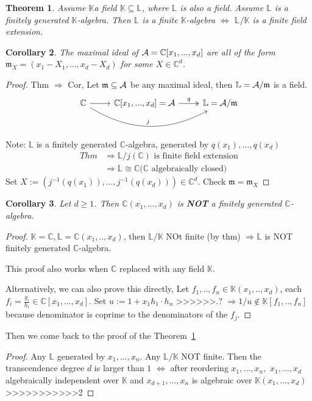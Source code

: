 \documentclass[11pt]{article}
\newtheorem{thm}{Theorem}[section]
\newtheorem{cor}[thm]{Corollary}
\newcommand{\cplx}{\mathbb C}
\newcommand{\bbk}{\mathbb K}
\newcommand{\scm}{{\mathfrak m}}
\newcommand{\cala}{{\cal A}}
\newcommand{\Lrta}{\Longrightarrow}
\newcommand{\Llrta}{\Longleftrightarrow}
\begin{document}
\begin{thm}\label{thm:finite_field_extension}
Assume $\bbk$a field $\bbk\subseteq \mathbb{L}$, where $\mathbb{L}$ is also a field. Assume $\mathbb{L}$ is a finitely generated $\bbk$-algebra. Then $\mathbb{L}$ is a finite $\bbk$-algebra $\Llrta$ $\mathbb{L}/\bbk$ is a finite field extension.
\end{thm}

\begin{cor}
The maximal ideal of $\cala=\cplx[x_1,...,x_d]$ are all of the form $\scm_X=(x_1-X_1,...,x_d-X_d)$ for some $X\in\cplx^d$.
\end{cor}
\begin{proof}
Thm $\Lrta$ Cor, Let $\scm\subseteq \cala$ be any maximal ideal, then $\mathbb{L}=\cala/\scm$ is a field.
 \[
\begin{tikzcd}
\cplx\ar[r]\ar[rr,bend right,"j"]&\cplx[x_1,...,x_d]=\cala\ar[r,two heads,"q"]&\mathbb{L}=\cala/\scm  
\end{tikzcd}
\] 
Note: $\mathbb{L}$ is a finitely generated $\cplx$-algebra, generated by $q(x_1),...,q(x_d)$
$$
\begin{aligned}
Thm&\Lrta \mathbb{L}/j(\cplx)\text{ is finite field extension}\\
 & \Lrta
\mathbb{L}\cong \cplx \text{($\cplx$ algebraically closed)}
\end{aligned}
$$
Set $X:=(j^{-1}(q(x_1)),...,j^{-1}(q(x_d)))\in \cplx^d$. Check $\scm=\scm_X$
\end{proof}

\begin{cor}
Let $d\geq 1$. Then $\cplx(x_1,...,x_d)$ is \textbf{NOT} a finitely generated $\cplx$-algebra.
\end{cor}
\begin{proof}
$\bbk=\cplx, \mathbb{L}=\cplx(x_1,..,x_d)$, then $\mathbb{L}/\bbk$ NOt finite (by thm) $\Lrta \mathbb{L}$ is NOT finitely generated $\cplx$-algebra.

This proof also works when $\cplx$ replaced with any field $\bbk$.

Alternatively, we can also prove this directly, Let $f_1,..,f_n\in\bbk(x_1,..,x_d)$, each $f_i=\frac{g_i}{h_i}\in \cplx[x_1,...,x_d]$. Set $u:=1+x_1 h_1\cdot h_n$
>>>>>>.?
$\Lrta 1/u\notin \bbk[f_1,..,f_n]$ because denominator is coprime to the denominators of the $f_j$.
\end{proof}

Then we come back to the proof of the Theorem~\ref{thm:finite_field_extension}
\begin{proof}
Any $\mathbb{L}$ generated by $x_1,...,x_n$. Any $\mathbb{L}/\bbk$ NOT finite. Then the  transcendence degree $d$ is larger than $1$
$\Llrta$ after reordering $x_1,...,x_n,$ $x_1,...,x_d$ algebraically independent over $\bbk$ and $x_{d+1},...,x_n$ is algebraic over $\bbk(x_1,...,x_d)$
>>>>>>>>>>>2
\end{proof}
\end{document}
